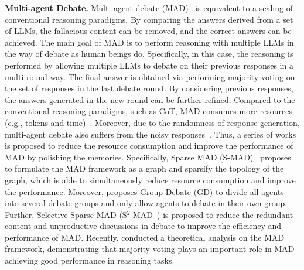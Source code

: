\documentclass{article} %
\theoremstyle{plain}
\begin{document}
\textbf{Multi-agent Debate.} Multi-agent debate (MAD)~\citep{mad_yilun} is equivalent to a scaling of conventional reasoning paradigms. By comparing the answers derived from a set of LLMs, the fallacious content can be removed, and the correct answers can be achieved. The main goal of MAD is to perform reasoning with multiple LLMs in the way of debate as human beings do. Specifically, in this case, the reasoning is performed by allowing multiple LLMs to debate on their previous responses in a multi-round way. The final answer is obtained via performing majority voting on the set of responses in the last debate round. By considering previous responses, the answers generated in the new round can be further refined. Compared to the conventional reasoning paradigms, such as CoT, MAD consumes more resources (e.g., tokens and time)~\citep{mad_yilun,li2024improving,groupdebate,s2_mad}. Moreover, due to the randomness of response generation, multi-agent debate also suffers from the noisy responses~\citep{s2_mad}. Thus, a series of works is proposed to reduce the resource consumption and improve the performance of MAD by polishing the memories. Specifically, Sparse MAD (S-MAD)~\citep{li2024improving} proposes to formulate the MAD framework as a graph and sparsify the topology of the graph, which is able to simultaneously reduce resource consumption and improve the performance. Moreover, \cite{groupdebate} proposes Group Debate (GD) to divide all agents into several debate groups and only allow agents to debate in their own group. Further, Selective Sparse MAD (S$^2$-MAD~\citep{s2_mad}) is proposed to reduce the redundant content and unproductive discussions in debate to improve the efficiency and performance of MAD. Recently, \citet{choi2025debate} conducted a theoretical analysis on the MAD framework, demonstrating that majority voting plays an important role in MAD achieving good performance in reasoning tasks.
\end{document}
